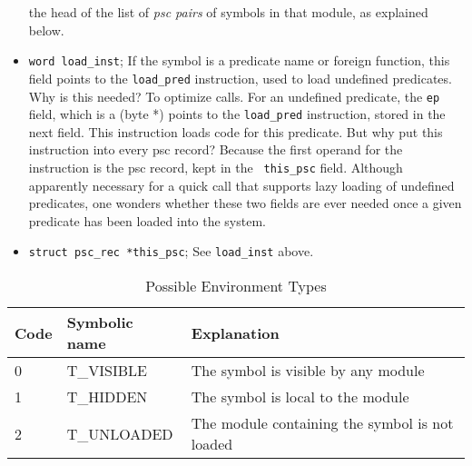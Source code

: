 \documentclass[11pt]{article}
\begin{document}
\begin{itemize}
the head of the list of {\em psc pairs} of symbols in that module, as
explained below.
%
\item {\tt word load\_inst}; If the symbol is a predicate name or
foreign function, this field points to the {\tt load\_pred}
instruction, used to load undefined predicates.  Why is this needed?
To optimize calls.  For an undefined predicate, the {\tt ep} field,
which is a (byte *) points to the {\tt load\_pred} instruction, stored
in the next field.  This instruction loads code for this predicate.
But why put this instruction into every psc record?  Because the first
operand for the instruction is the psc record, kept in the {\tt
this\_psc} field.  Although apparently necessary for a quick call that
supports lazy loading of undefined predicates, one wonders whether
these two fields are ever needed once a given predicate has been
loaded into the system.

\item {\tt struct psc\_rec *this\_psc}; See {\tt load\_inst} above.
\end{itemize}
%
\begin{table}\centering
\begin{tabular}{l|l|l}
\hline
Code	& Symbolic name	& Explanation				\\
\hline
 0	& T\_VISIBLE	& The symbol is visible by any module	\\
 1	& T\_HIDDEN	& The symbol is local to the module 	\\
 2	& T\_UNLOADED	& The module containing the symbol is not loaded \\
\hline
\end{tabular}
\caption{Possible Environment Types}
\label{t:env}
\end{table}
%
\end{document}
